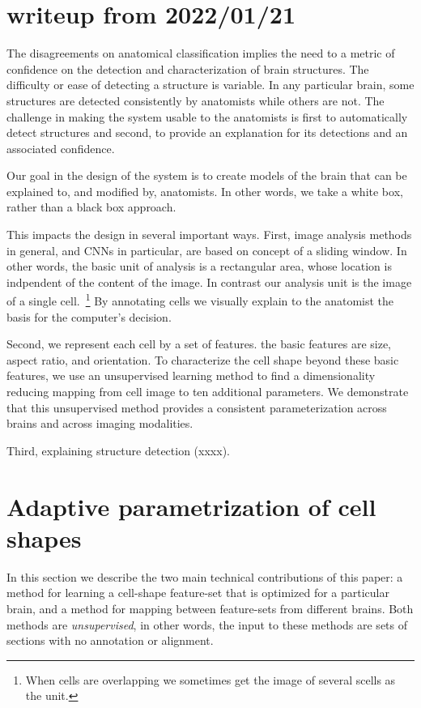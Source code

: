 \documentclass[runningheads]{llncs}
\begin{document}
\section{writeup from 2022/01/21}
The disagreements on anatomical classification implies the need to a metric of confidence on the detection and characterization of brain structures.
The difficulty or ease of detecting a structure is variable. 
In any particular brain, some structures are detected consistently by anatomists while others are not.
The challenge in making the system usable to the anatomists is first to automatically detect structures and second, to provide an explanation for its detections and an associated confidence.

Our goal in the design of the system is to create models of the brain
that can be explained to, and modified by, anatomists. In other words,
we take a white box, rather than a black box approach.

This impacts the design in several important ways. First, image
analysis methods in general, and CNNs in particular, are based on
concept of a sliding window. In other words, the basic unit of
analysis is a rectangular area, whose location is indpendent of the
content of the image. In contrast our analysis unit is the image of a
single cell.~\footnote{When cells are overlapping we sometimes get
  the image of several scells as the unit.} By annotating cells we
visually explain to the anatomist the basis for the computer's
decision.

Second, we represent each cell by a set of features. the basic 
features are size, aspect ratio, and orientation. To characterize the
cell shape beyond these basic features, we use an unsupervised
learning method to find a dimensionality reducing mapping from cell
image to ten additional parameters. We demonstrate that this
unsupervised method provides a consistent parameterization across
brains and across imaging modalities.

Third, explaining structure detection (xxxx).



\section{Adaptive parametrization of cell shapes}
\label{sec:DM}
In this section we describe the two main technical contributions of this
paper: a method for learning a cell-shape feature-set that is optimized
for a particular brain, and a method for mapping between feature-sets
from different brains. Both methods are {\em unsupervised}, in other
words, the input to these methods are sets of sections with no
annotation or alignment.
\end{document}
